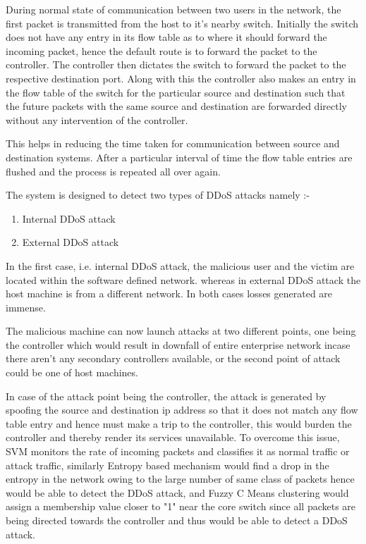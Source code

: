 \documentclass[12pt,a4paper,final]{report}
\begin{document}
During normal state of communication between two users in the network, the first packet is transmitted from the host to it's nearby switch. Initially the switch does not have any entry in its flow table as to where it should forward the incoming packet, hence the default route is to forward the packet to the controller. The controller then dictates the switch to forward the packet to the respective destination port. Along with this the controller also makes an entry in the flow table of the switch for the particular source and destination such that the future packets with the same source and destination are forwarded directly without any intervention of the controller.

This helps in reducing the time taken for communication between source and destination systems. After a particular interval of time the flow table entries are flushed and the process is repeated all over again.

The system is designed to detect two types of DDoS attacks namely :-
\begin{enumerate}
\item
Internal DDoS attack

\item
External DDoS attack
\end{enumerate}

In the first case, i.e. internal DDoS attack, the malicious user and the victim are located within the software defined network. 
whereas in external DDoS attack the host machine is from a different network. In both cases losses generated are immense.

The malicious machine can now launch attacks at two different points, one being the controller which would result in downfall of entire enterprise network incase there aren't any secondary controllers available, or the second point of attack could be one of host machines. 

In case of the attack point being the controller, the attack is generated by spoofing the source and destination ip address so that it does not match any flow table entry and hence must make a trip to the controller, this would burden the controller and thereby render its services unavailable. To overcome this issue, SVM monitors the rate of incoming packets and classifies it as normal traffic or attack traffic, similarly Entropy based mechanism would find a drop in the entropy in the network owing to the large number of same class of packets hence would be able to detect the DDoS attack, and Fuzzy C Means clustering would assign a membership value closer to "1" near the core switch since all packets are being directed towards the controller and thus would be able to detect a DDoS attack.
\end{document}
